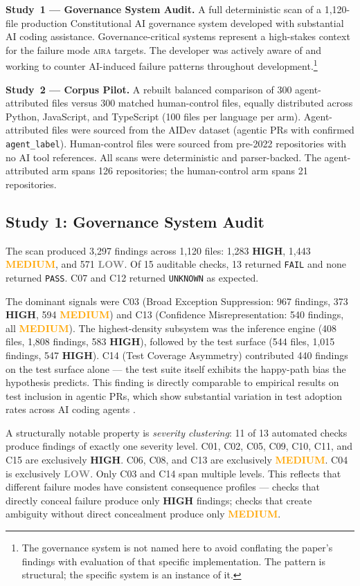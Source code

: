 \documentclass[11pt]{article}
\newcommand{\aira}{\textsc{aira}}
\newcommand{\HIGH}{\textcolor{aira-red}{\textbf{HIGH}}}
\newcommand{\MED}{\textcolor{orange}{\textbf{MEDIUM}}}
\newcommand{\LOW}{\textcolor{gray}{\textbf{LOW}}}
\begin{document}
\textbf{Study~1 --- Governance System Audit.} A full deterministic scan of a 1,120-file
production Constitutional AI governance system developed with substantial AI coding assistance.
Governance-critical systems represent a high-stakes context for the failure mode \aira{}
targets. The developer was actively aware of and working to counter AI-induced failure
patterns throughout development.\footnote{The governance system is not named here to avoid
conflating the paper's findings with evaluation of that specific implementation. The pattern
is structural; the specific system is an instance of it.}

\textbf{Study~2 --- Corpus Pilot.} A rebuilt balanced comparison of 300 agent-attributed
files versus 300 matched human-control files, equally distributed across Python, JavaScript,
and TypeScript (100 files per language per arm). Agent-attributed files were sourced from
the AIDev dataset \citep{li2025aidev} (agentic PRs with confirmed \texttt{agent\_label}).
Human-control files were sourced from pre-2022 repositories with no AI tool references.
All scans were deterministic and parser-backed. The agent-attributed arm spans 126
repositories; the human-control arm spans 21 repositories.

\subsection{Study 1: Governance System Audit}
\label{sec:study1}

The scan produced 3,297 findings across 1,120 files: 1,283 \HIGH{}, 1,443 \MED{}, and
571 \LOW{}. Of 15 auditable checks, 13 returned \texttt{FAIL} and none returned
\texttt{PASS}. C07 and C12 returned \texttt{UNKNOWN} as expected.

The dominant signals were C03 (Broad Exception Suppression: 967 findings, 373 \HIGH{},
594 \MED{}) and C13 (Confidence Misrepresentation: 540 findings, all \MED{}). The
highest-density subsystem was the inference engine (408 files, 1,808 findings, 583 \HIGH{}),
followed by the test surface (544 files, 1,015 findings, 547 \HIGH{}). C14 (Test Coverage
Asymmetry) contributed 440 findings on the test surface alone --- the test suite itself
exhibits the happy-path bias the hypothesis predicts. This finding is directly comparable
to empirical results on test inclusion in agentic PRs, which show substantial variation in
test adoption rates across AI coding agents \citep{haque2026tests}.

A structurally notable property is \emph{severity clustering}: 11 of 13 automated checks
produce findings of exactly one severity level. C01, C02, C05, C09, C10, C11, and C15 are
exclusively \HIGH{}. C06, C08, and C13 are exclusively \MED{}. C04 is exclusively \LOW{}.
Only C03 and C14 span multiple levels. This reflects that different failure modes have
consistent consequence profiles --- checks that directly conceal failure produce only
\HIGH{} findings; checks that create ambiguity without direct concealment produce only \MED{}.
\end{document}

